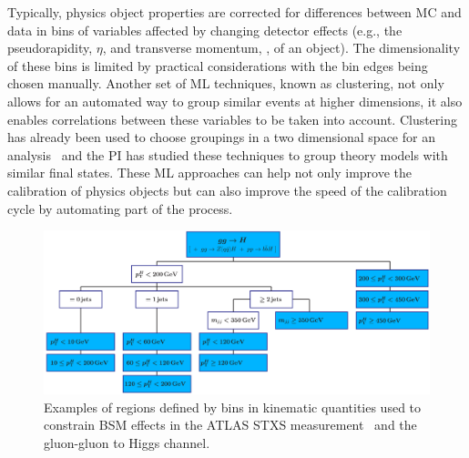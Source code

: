 \documentclass[letter, USenglish, 11pt, subfigure]{article}
\begin{document}
Typically, physics object properties are corrected for differences between MC and data in bins of variables affected by changing detector effects (e.g., the pseudorapidity, $\eta$, and transverse momentum, \pt, of an object). The dimensionality of these bins is limited by practical considerations with the bin edges being chosen manually. Another set of ML techniques, known as clustering, not only allows for an automated way to group similar events at higher dimensions, it also enables correlations between these variables to be taken into account. Clustering has already been used to choose groupings in a two dimensional space for an analysis~\cite{ttH_tau_CMS} and the PI has studied these techniques to group theory models with similar final states. These ML approaches can help not only improve the calibration of physics objects but can also improve the speed of the calibration cycle by automating part of the process.

\begin{figure}[!htbp]  
  \centering
  \includegraphics[width=\textwidth]{figures/ggH_STXS.pdf}
  \caption{\label{fig:ggH_STXS} Examples of regions defined by bins in kinematic quantities used to constrain BSM effects in the ATLAS STXS measurement~\cite{ATLAS_STXS} and the gluon-gluon to Higgs channel.}
\end{figure}
\end{document}
